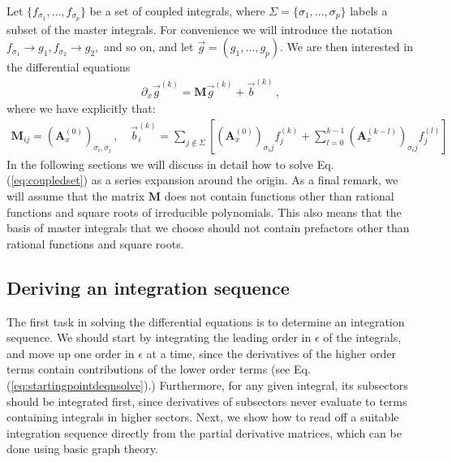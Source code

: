 \documentclass{article}
\begin{document}
Let $\{f_{\sigma_1},\ldots,f_{\sigma_p}\}$ be a set of coupled integrals, where $\Sigma = \{\sigma_1,\ldots,\sigma_p\}$ labels a subset of the master integrals. For convenience we will introduce the notation $f_{\sigma_1} \rightarrow g_1, f_{\sigma_2} \rightarrow g_2,$ and so on, and let $\vec{g} = (g_1,\ldots,g_p)$. We are then interested in the differential equations
\begin{align}
    \label{eq:coupledset}
    \partial_x \vec{g}^{(k)} = \mathbf{M} \vec{g}^{(k)} + \vec{b}^{(k)}\,,
\end{align}
where we have explicitly that:
\begin{align}
    \label{eq:coupledsetdecomposed}
    \mathbf{M}_{ij} =  (\mathbf{A}^{(0)}_x)_{\sigma_i,\sigma_j}\,, \quad \vec{b}_{i}^{(k)}=\sum_{j \notin \Sigma}\left[\left(\mathbf{A}_{x}^{(0)}\right)_{\sigma_{i} j} f_{j}^{(k)}+\sum_{l=0}^{k-1}\left(\mathbf{A}_{x}^{(k-l)}\right)_{\sigma_{i} j} f_{j}^{(l)}\right]
\end{align}
In the following sections we will discuss in detail how to solve Eq. (\ref{eq:coupledset}) as a series expansion around the origin. As a final remark, we will assume that the matrix $\mathbf{M}$ does not contain functions other than rational functions and square roots of irreducible polynomials. This also means that the basis of master integrals that we choose should not contain prefactors other than rational functions and square roots.

\subsection{Deriving an integration sequence}
\label{sec:intorder}
The first task in solving the differential equations is to determine an integration sequence. We should start by integrating the leading order in $\epsilon$ of the integrals, and move up one order in $\epsilon$ at a time, since the derivatives of the higher order terms contain contributions of the lower order terms (see Eq. (\ref{eq:startingpointdeqnsolve}).) Furthermore, for any given integral, its subsectors should be integrated first, since derivatives of subsectors never evaluate to terms containing integrals in higher sectors. Next, we show how to read off a suitable integration sequence directly from the partial derivative matrices, which can be done using basic graph theory.
\end{document}
